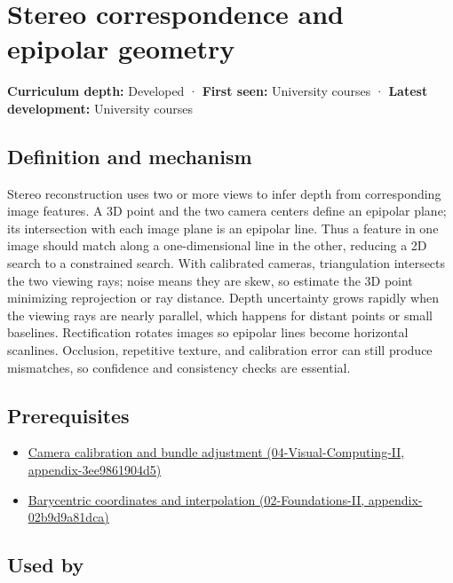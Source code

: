 \hypertarget{appendix-c4e98b6e4001}{}
\section{Stereo correspondence and epipolar geometry}\label{appendix-c4e98b6e4001-stereo-correspondence-and-epipolar-geometry}

\textbf{Curriculum depth:} Developed · \textbf{First seen:} University courses · \textbf{Latest development:} University courses

\subsection{Definition and mechanism}\label{appendix-c4e98b6e4001-definition-and-mechanism}

Stereo reconstruction uses two or more views to infer depth from corresponding image features. A 3D point and the two camera centers define an epipolar plane; its intersection with each image plane is an epipolar line. Thus a feature in one image should match along a one-dimensional line in the other, reducing a 2D search to a constrained search. With calibrated cameras, triangulation intersects the two viewing rays; noise means they are skew, so estimate the 3D point minimizing reprojection or ray distance. Depth uncertainty grows rapidly when the viewing rays are nearly parallel, which happens for distant points or small baselines. Rectification rotates images so epipolar lines become horizontal scanlines. Occlusion, repetitive texture, and calibration error can still produce mismatches, so confidence and consistency checks are essential.

\subsection{Prerequisites}\label{appendix-c4e98b6e4001-prerequisites}

\begin{itemize}
\tightlist
\item
  \href{../04-Visual-Computing-II/main.pdf\#nameddest=appendix-3ee9861904d5}{Camera calibration and bundle adjustment (04-Visual-Computing-II, appendix-3ee9861904d5)}
\item
  \href{../02-Foundations-II/main.pdf\#nameddest=appendix-02b9d9a81dca}{Barycentric coordinates and interpolation (02-Foundations-II, appendix-02b9d9a81dca)}
\end{itemize}

\subsection{Used by}\label{appendix-c4e98b6e4001-used-by}

